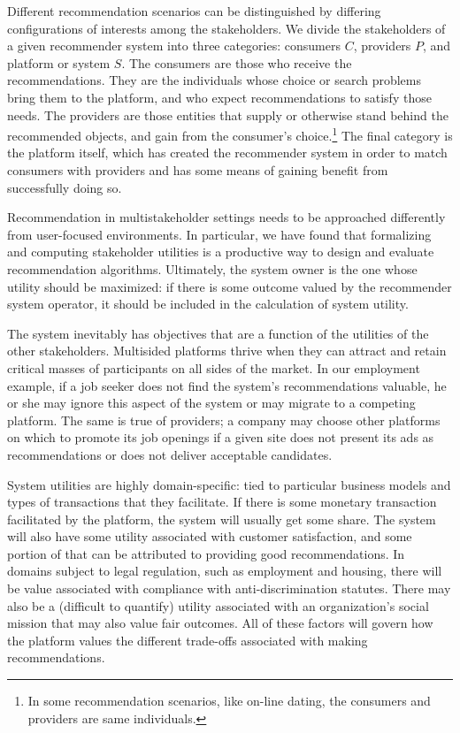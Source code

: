 Different recommendation scenarios can be distinguished by differing configurations of interests among the stakeholders. We divide the stakeholders of a given recommender system into three categories: consumers $C$, providers $P$, and platform or system $S$. The consumers are those who receive the recommendations. They are the individuals whose choice or search problems bring them to the platform, and who expect recommendations to satisfy those needs. The providers are those entities that supply or otherwise stand behind the recommended objects, and gain from the consumer's choice.\footnote{In some recommendation scenarios, like on-line dating, the consumers and providers are same individuals.} The final category is the platform itself, which has created the recommender system in order to match consumers with providers and has some means of gaining benefit from successfully doing so. 

Recommendation in multistakeholder settings needs to be approached differently from user-focused environments. In particular, we have found that formalizing and computing stakeholder utilities is a productive way to design and evaluate recommendation algorithms. Ultimately, the system owner is the one whose utility should be maximized: if there is some outcome valued by the recommender system operator, it should be included in the calculation of system utility. 

The system inevitably has objectives that are a function of the utilities of the other stakeholders. Multisided platforms thrive when they can attract and retain critical masses of participants on all sides of the market. In our employment example, if a job seeker does not find the system's recommendations valuable, he or she may ignore this aspect of the system or may migrate to a competing platform. The same is true of providers; a company may choose other platforms on which to promote its job openings if a given site does not present its ads as recommendations or does not deliver acceptable candidates.

System utilities are highly domain-specific: tied to particular business models and types of transactions that they facilitate. If there is some monetary transaction facilitated by the platform, the system will usually get some share. The system will also have some utility associated with customer satisfaction, and some portion of that can be attributed to providing good recommendations. In domains subject to legal regulation, such as employment and housing, there will be value associated with compliance with anti-discrimination statutes. There may also be a (difficult to quantify) utility associated with an organization's social mission that may also value fair outcomes. All of these factors will govern how the platform values the different trade-offs associated with making recommendations.

